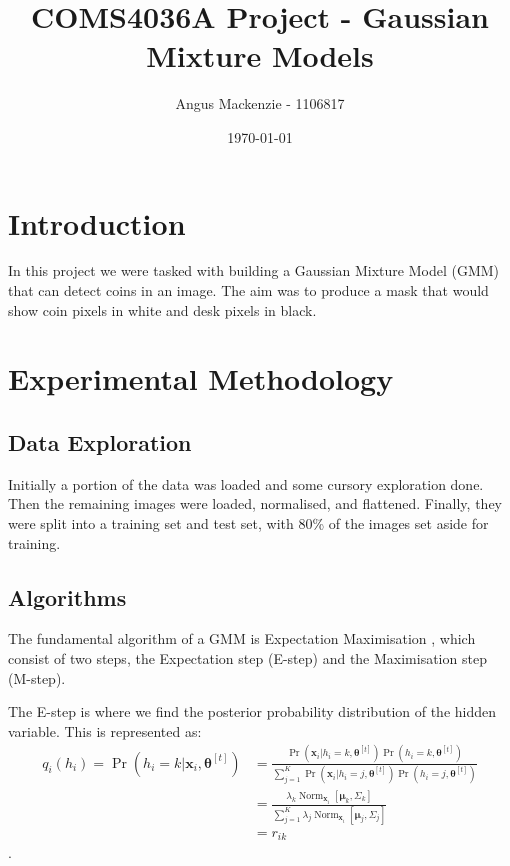 \documentclass[10pt]{article}
\begin{document}
\title{COMS4036A Project - Gaussian Mixture Models}
\author{Angus Mackenzie - 1106817}
\date{\today} 
\maketitle 
\pagestyle{fancy}
\fancyhf{}
\fancyhead[R]{\thepage}
{}
\section{Introduction}
In this project we were tasked with building a Gaussian Mixture Model (GMM) \cite{princeCVMLI2012} that can detect coins in an image. The aim was to produce a mask that would show coin pixels in white and desk pixels in black.

\section{Experimental Methodology}
\subsection{Data Exploration}
Initially a portion of the data was loaded and some cursory exploration done. Then the remaining images were loaded, normalised, and flattened. Finally, they were split into a training set and test set, with 80\% of the images set aside for training. 

\subsection{Algorithms}
The fundamental algorithm of a GMM is Expectation Maximisation \cite{princeCVMLI2012}, which consist of two steps, the Expectation step (E-step) and the Maximisation step (M-step). 

The E-step is where we find the posterior probability distribution of the hidden variable. This is represented as:
$$
\begin{aligned} q_{i}\left(h_{i}\right)=\operatorname{Pr}\left(h_{i}=k | \mathbf{x}_{i}, \boldsymbol{\theta}^{[t]}\right) &=\frac{\operatorname{Pr}\left(\mathbf{x}_{i} | h_{i}=k, \boldsymbol{\theta}^{[t]}\right) \operatorname{Pr}\left(h_{i}=k, \boldsymbol{\theta}^{[t]}\right)}{\sum_{j=1}^{K} \operatorname{Pr}\left(\mathbf{x}_{i} | h_{i}=j, \boldsymbol{\theta}^{[t]}\right) \operatorname{Pr}\left(h_{i}=j, \boldsymbol{\theta}^{[t]}\right)} \\ &=\frac{\lambda_{k} \operatorname{Norm}_{\mathbf{x}_{i}}\left[\boldsymbol{\mu}_{k}, \Sigma_{k}\right]}{\sum_{j=1}^{K} \lambda_{j} \operatorname{Norm}_{\mathbf{x}_{i}}\left[\boldsymbol{\mu}_{j}, \Sigma_{j}\right]} \\ &=r_{i k} \end{aligned}
$$ \cite{princeCVMLI2012}.
\end{document}
